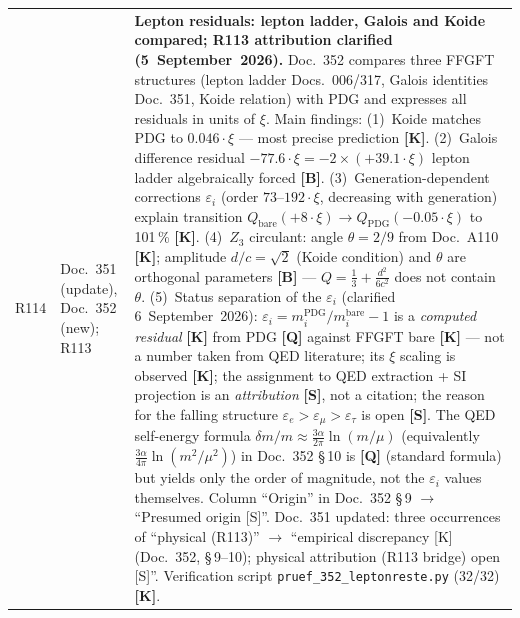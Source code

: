 \begin{longtable}{@{}p{0.9cm}p{3.1cm}p{10.2cm}@{}}
R114 & Doc.~351 (update), Doc.~352 (new); R113 & \textbf{Lepton residuals: lepton ladder, Galois and Koide compared; R113 attribution clarified \QM{} (5~September~2026).} Doc.~352 compares three FFGFT structures (lepton ladder Docs.~006/317, Galois identities Doc.~351, Koide relation) with PDG and expresses all residuals in units of $\xi$. Main findings: (1)~Koide matches PDG to $0.046\cdot\xi$ --- most precise prediction \textbf{[K]}. (2)~Galois difference residual $-77.6\cdot\xi = -2\times(+39.1\cdot\xi)$ lepton ladder algebraically forced \textbf{[B]}. (3)~Generation-dependent corrections $\varepsilon_i$ (order $73$--$192\cdot\xi$, decreasing with generation) explain transition $Q_{\mathrm{bare}}(+8\cdot\xi)\to Q_{\mathrm{PDG}}(-0.05\cdot\xi)$ to 101\,\% \textbf{[K]}. (4)~$Z_3$ circulant: angle $\theta=2/9$ from Doc.~A110 \textbf{[K]}; amplitude $d/c=\sqrt{2}$ (Koide condition) and $\theta$ are orthogonal parameters \textbf{[B]} --- $Q=\tfrac{1}{3}+\tfrac{d^2}{6c^2}$ does not contain $\theta$. (5)~Status separation of the $\varepsilon_i$ (clarified 6~September~2026): $\varepsilon_i = m_i^{\mathrm{PDG}}/m_i^{\mathrm{bare}} - 1$ is a \emph{computed residual} \textbf{[K]} from PDG \textbf{[Q]} against FFGFT bare \textbf{[K]} --- not a number taken from QED literature; its $\xi$ scaling is observed \textbf{[K]}; the assignment to QED extraction + SI projection is an \emph{attribution} \textbf{[S]}, not a citation; the reason for the falling structure $\varepsilon_e>\varepsilon_\mu>\varepsilon_\tau$ is open \textbf{[S]}. The QED self-energy formula $\delta m/m\approx\tfrac{3\alpha}{2\pi}\ln(m/\mu)$ (equivalently $\tfrac{3\alpha}{4\pi}\ln(m^2/\mu^2)$) in Doc.~352 §\,10 is \textbf{[Q]} (standard formula) but yields only the order of magnitude, not the $\varepsilon_i$ values themselves. Column ``Origin'' in Doc.~352 §\,9 $\to$ ``Presumed origin [S]''. Doc.~351 updated: three occurrences of ``physical (R113)'' $\to$ ``empirical discrepancy [K] (Doc.~352, §\,9--10); physical attribution (R113 bridge) open [S]''. Verification script \texttt{pruef\_352\_leptonreste.py} (32/32) \textbf{[K]}. \\

\end{longtable}

